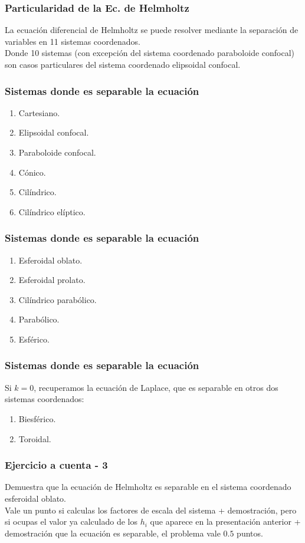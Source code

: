 \documentclass[12pt]{beamer}
\begin{document}
\begin{frame}
\frametitle{Particularidad de la Ec. de Helmholtz}
La ecuación diferencial de Helmholtz se puede resolver mediante la separación de variables en 11 sistemas coordenados.
\\
\bigskip
\pause
Donde 10 sistemas (con excepción del sistema coordenado paraboloide confocal) son casos particulares del sistema coordenado elipsoidal confocal.
\end{frame}
\begin{frame}
\frametitle{Sistemas donde es separable la ecuación}
\begin{enumerate}[<+->]
\item Cartesiano.
\item Elipsoidal confocal.
\item Paraboloide confocal.
\item Cónico.
\item Cilíndrico.
\item Cilíndrico elíptico.
\seti
\end{enumerate}
\end{frame}
\begin{frame}
\frametitle{Sistemas donde es separable la ecuación}
\begin{enumerate}[<+->]
\conti    
\item Esferoidal oblato.
\item Esferoidal prolato.
\item Cilíndrico parabólico.
\item Parabólico.
\item Esférico.
\end{enumerate}
\end{frame}
\begin{frame}
\frametitle{Sistemas donde es separable la ecuación}
Si $k = 0$, recuperamos la ecuación de Laplace, que es separable en otros dos sistemas coordenados:
\begin{enumerate}[<+->]
\item Biesférico.
\item Toroidal.
\end{enumerate}
\end{frame}
\begin{frame}
\frametitle{Ejercicio a cuenta - 3}
Demuestra que la ecuación de Helmholtz es separable en el sistema coordenado esferoidal oblato.
\\
\bigskip
Vale un punto si calculas los factores de escala del sistema + demostración, pero si ocupas el valor ya calculado de los $h_{i}$ que aparece en la presentación anterior + demostración que la ecuación es separable, el problema vale $0.5$ puntos.
\end{frame}
\end{document}
